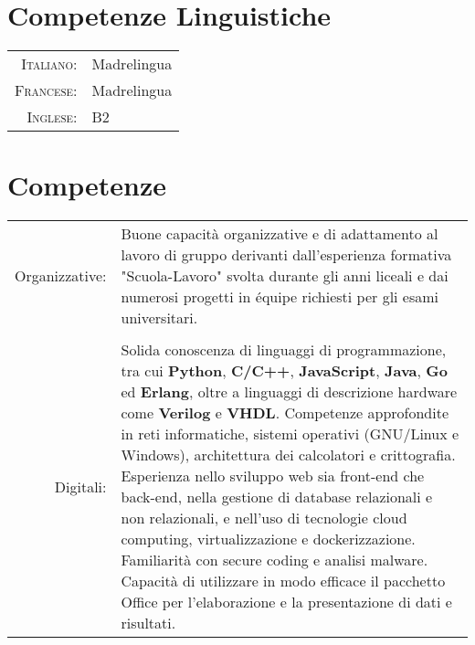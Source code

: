 \documentclass[a4paper,11pt]{article} %
\begin{document}

\section{Competenze Linguistiche}

\begin{tabular}{rl}

\textsc{Italiano:} & Madrelingua\\

\textsc{Francese:} & Madrelingua\\

\textsc{Inglese:} & B2\\
\end{tabular}


\section{Competenze}

\begin{tabular}{rl}
\multicolumn{1}{p{2.5cm}}{Organizzative:} & \multicolumn{1}{p{11.5cm}}{Buone capacità organizzative e di adattamento al lavoro di gruppo derivanti dall'esperienza formativa "Scuola-Lavoro" svolta durante gli anni liceali e dai numerosi progetti in équipe richiesti per gli esami universitari.}\\
\\

\multicolumn{1}{p{2.5cm}}{Digitali:} & \multicolumn{1}{p{11.5cm}}{Solida conoscenza di linguaggi di programmazione, tra cui \textbf{Python}, \textbf{C/C++}, \textbf{JavaScript}, \textbf{Java}, \textbf{Go} ed \textbf{Erlang}, oltre a linguaggi di descrizione hardware come \textbf{Verilog} e \textbf{VHDL}. Competenze approfondite in reti informatiche, sistemi operativi (GNU/Linux e Windows), architettura dei calcolatori e crittografia. Esperienza nello sviluppo web sia front-end che back-end, nella gestione di database relazionali e non relazionali, e nell’uso di tecnologie cloud computing, virtualizzazione e dockerizzazione. Familiarità con secure coding e analisi malware. Capacità di utilizzare in modo efficace il pacchetto Office per l’elaborazione e la presentazione di dati e risultati.}\\
\end{tabular}
\end{document}
